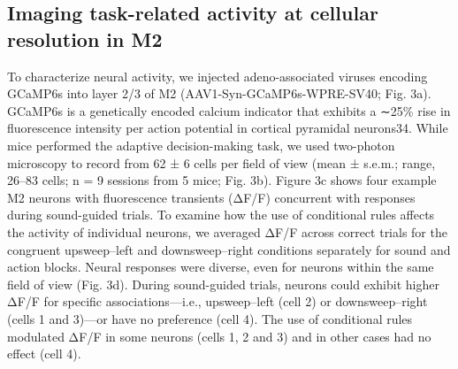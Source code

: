 \subsection{Imaging task-related activity at cellular resolution in M2}
To characterize neural activity, we injected adeno-associated viruses encoding GCaMP6s into layer 2/3 of M2 (AAV1-Syn-GCaMP6s-WPRE-SV40; Fig. 3a). GCaMP6s is a genetically encoded calcium indicator that exhibits a ∼25\% rise in fluorescence intensity per action potential in cortical pyramidal neurons34. While mice performed the adaptive decision-making task, we used two-photon microscopy to record from 62 ± 6 cells per field of view (mean ± s.e.m.; range, 26–83 cells; n = 9 sessions from 5 mice; Fig. 3b). Figure 3c shows four example M2 neurons with fluorescence transients (ΔF/F) concurrent with responses during sound-guided trials. To examine how the use of conditional rules affects the activity of individual neurons, we averaged ΔF/F across correct trials for the congruent upsweep–left and downsweep–right conditions separately for sound and action blocks. Neural responses were diverse, even for neurons within the same field of view (Fig. 3d). During sound-guided trials, neurons could exhibit higher ΔF/F for specific associations—i.e., upsweep–left (cell 2) or downsweep–right (cells 1 and 3)—or have no preference (cell 4). The use of conditional rules modulated ΔF/F in some neurons (cells 1, 2 and 3) and in other cases had no effect (cell 4).

